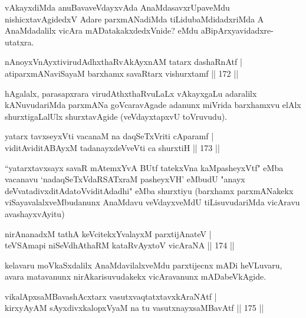 \begin{artha}
vAkayxdiMda anuBavaveVdayxvAda AnaMdasavxrUpaveMdu nishicxtavAgidedxV Adare parxmANadiMda tiLidubaMdidadxriMda A AnaMdadalilx vicAra mADatakakxdedxVnide? eMdu aBipArxyavidadxre- utatxra.
\end{artha}%

\begin{shl}
nAnoyxVnAyxtivirudAdhxthaRvAkAyxnAM tatarx dashaRnAtf |\\
atiparxmANaviSayaM barxhamx savaRtarx vishurxtamf \hfill || 172 ||
\end{shl}

\begin{artha}
hAgalalx, parasapxrara virudAthxthaRvuLaLx vAkayxgaLu adaralilx kANuvudariMda parxmANa goVcaravAgade adanunx miVrida barxhamxvu elAlx shurxtigaLalUlx shurxtavAgide (veVdayxtapxvU toVruvudu).
\end{artha}

\begin{shl}
yatarx tavxseyxVti vacanaM na daqSeTxVriti cAparamf |\\
viditAviditABAyxM tadanayxdeVveVti ca shurxtiH \hfill || 173 ||
\end{shl}

\begin{artha}
``yatarxtavxsayx savaR mAtemxYvA BUtf tatekxVna kaMpasheyxVtf" eMba vacanavu `nadaqSeTxVdaRSATxraM pasheyxVH' eMbudU "anayx deVvatadivxditAdatoV\s viditAdadhi" eMba shurxtiyu (barxhamx parxmANakekx viSayavalalxveMbudanunx AnaMdavu veVdayxveMdU tiLisuvudariMda vicAravu avashayxvAyitu)
\end{artha}

\begin{shl}
nirAnanadxM tathA keVcitekxYvalayxM parxtijAnateV |\\
teVSAmapi niSeVdhAthaRM kataRvAyx\s toV vicAraNA \hfill || 174 ||
\end{shl}

\begin{artha}
kelavaru moVkaSxdalilx AnaMdavilalxveMdu parxtijecnx mADi heVLuvaru, avara matavanunx nirAkarisuvudakekx vicAravanunx mADabeVkAgide.
\end{artha}


\begin{shl}
vikalApxsaMBavashAcxtarx vasutxvaqtatxtavxkAraNAtf |\\
kirxyAyAM sAyxdivxkalopxV\s yaM na tu vasutxnayxsaMBavAtf \hfill || 175 ||
\end{shl}

